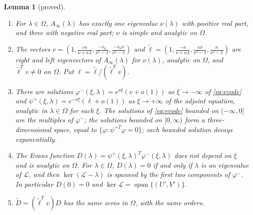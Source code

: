 \documentclass[11pt]{article}
\newtheorem{lemma}{Lemma}[section]
\theoremstyle{definition}
\newcommand{\eps}{\varepsilon}
\newcommand{\Lop}{\mathcal{L}}
\begin{document}
\begin{lemma}[proved]\label{lem:evans}
\begin{enumerate}
\item[(a)] For $\lambda \in \Omega$, $A_\infty(\lambda)$ has exactly one eigenvalue $\nu(\lambda)$ with positive real part, and three with negative real part; $\nu$ is simple and analytic on $\Omega$.
\item[(b)] The vectors $v = (1, \frac{\eps\kappa}{\nu + \kappa\lambda}, \frac{-s_0}{\nu^2 - 1}, \frac{-s_0\nu}{\nu^2 - 1})$ and $\tilde\ell = (1, \frac{-\kappa}{\nu + \kappa\lambda}, \frac{\kappa\nu}{\nu^2 - 1}, \frac{\kappa}{\nu^2 - 1})$ are right and left eigenvectors of $A_\infty(\lambda)$ for $\nu(\lambda)$, analytic on $\Omega$, and $\tilde\ell^Tv \ne 0$ on $\Omega$. Put $\ell = \tilde\ell/(\tilde\ell^Tv)$.
\item[(c)] There are solutions $\varphi^-(\xi, \lambda) = e^{\nu\xi}(v + o(1))$ as $\xi \to -\infty$ of \eqref{eq:evode} and $\psi^+(\xi, \lambda) = e^{-\nu\xi}(\ell + o(1))$ as $\xi \to +\infty$ of the adjoint equation, analytic in $\lambda \in \Omega$ for each $\xi$. The solutions of \eqref{eq:evode} bounded on $(-\infty, 0]$ are the multiples of $\varphi^-$; the solutions bounded on $[0, \infty)$ form a three-dimensional space, equal to $\{\varphi : \psi^{+T}\varphi = 0\}$; each bounded solution decays exponentially.
\item[(d)] The Evans function $D(\lambda) = \psi^+(\xi, \lambda)^T\varphi^-(\xi, \lambda)$ does not depend on $\xi$ and is analytic on $\Omega$. For $\lambda \in \Omega$, $D(\lambda) = 0$ if and only if $\lambda$ is an eigenvalue of $\Lop$, and then $\ker(\Lop - \lambda)$ is spanned by the first two components of $\varphi^-$. In particular $D(0) = 0$ and $\ker\Lop = \operatorname{span}\{(U', V')\}$.
\item[(e)] $\tilde D = (\tilde\ell^Tv) D$ has the same zeros in $\Omega$, with the same orders.
\end{enumerate}
\end{lemma}
\end{document}
